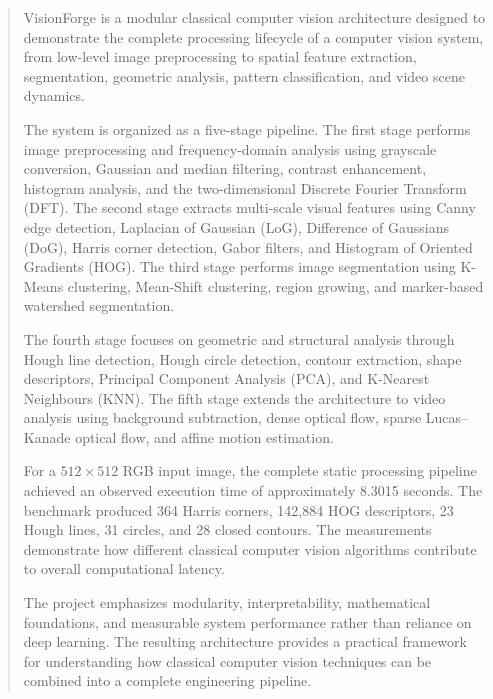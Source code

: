\documentclass[11pt,a4paper]{article}
\begin{document}

\newpage
{}


\begin{abstract}

VisionForge is a modular classical computer vision architecture designed to demonstrate the complete processing lifecycle of a computer vision system, from low-level image preprocessing to spatial feature extraction, segmentation, geometric analysis, pattern classification, and video scene dynamics.

The system is organized as a five-stage pipeline. The first stage performs image preprocessing and frequency-domain analysis using grayscale conversion, Gaussian and median filtering, contrast enhancement, histogram analysis, and the two-dimensional Discrete Fourier Transform (DFT). The second stage extracts multi-scale visual features using Canny edge detection, Laplacian of Gaussian (LoG), Difference of Gaussians (DoG), Harris corner detection, Gabor filters, and Histogram of Oriented Gradients (HOG). The third stage performs image segmentation using K-Means clustering, Mean-Shift clustering, region growing, and marker-based watershed segmentation.

The fourth stage focuses on geometric and structural analysis through Hough line detection, Hough circle detection, contour extraction, shape descriptors, Principal Component Analysis (PCA), and K-Nearest Neighbours (KNN). The fifth stage extends the architecture to video analysis using background subtraction, dense optical flow, sparse Lucas--Kanade optical flow, and affine motion estimation.

For a $512 \times 512$ RGB input image, the complete static processing pipeline achieved an observed execution time of approximately 8.3015 seconds. The benchmark produced 364 Harris corners, 142,884 HOG descriptors, 23 Hough lines, 31 circles, and 28 closed contours. The measurements demonstrate how different classical computer vision algorithms contribute to overall computational latency.

The project emphasizes modularity, interpretability, mathematical foundations, and measurable system performance rather than reliance on deep learning. The resulting architecture provides a practical framework for understanding how classical computer vision techniques can be combined into a complete engineering pipeline.

\end{abstract}
\end{document}
